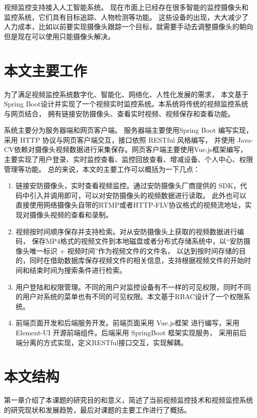 视频监控支持接入人工智能系统。
现在市面上已经存在很多智能的监控摄像头和监控系统，它们具有目标追踪、人物检测等功能。
这些设备的出现，大大减少了人力成本，比如以前要实现摄像头跟踪一个目标，就需要手动去调整摄像头的朝向
但是现在可以使用只能摄像头解决。

\section{本文主要工作}
为了满足视频监控系统数字化、智能化、网络化、人性化发展的需求，
本文基于Spring Boot设计并实现了一个视频实时监控系统。本系统将传统的视频监控系统与网页结合，
拥有链接安防摄像头、查看实时视频、视频保存和查看功能。

系统主要分为服务器端和网页客户端。
服务器端主要使用Spring Boot 编写实现，采用 HTTP 协议与网页客户端交互，接口依照 RESTful 风格编写，
并使用 Java-CV依赖对摄像头视频数据进行采集保存。网页客户端主要使用Vue.js框架编写，主要实现了用户登录、实时监控查看、监控回放查看、增减设备、个人中心、权限管理等功能。
总的来说，本文的主要工作可以概括为一下几点：
\begin{enumerate}
    \item 链接安防摄像头，实时查看视频监控。通过安防摄像头厂商提供的 SDK，代码中引入并调用即可，可以对安防摄像头的视频数据进行读取。
    此外也可以直接使用网络摄像头自带的RTMP或者HTTP-FLV协议格式的视频流地址，实现对摄像头视频的查看和录制。
    \item 视频按时间顺序保存并支持检索。对从安防摄像头上获取的视频数据进行编码，
    保存MP4格式的视频文件到本地磁盘或者分布式存储系统中，以“安防摄像头唯一标识 + 视频时间”作为视频文件的文件名，
    以达到按时间存储的目的，同时在借助数据库保存视频文件的相关信息，支持根据视频文件的开始时间和结束时间为搜索条件进行检索。
    \item 用户登陆和权限管理。不同的用户对监控设备有不一样的可见权限，同时不同的用户对系统的菜单也有不同的可见权限。本文基于RBAC设计了一个权限系统。
    \item 前端页面开发和后端服务开发。前端页面采用 Vue.js框架 进行编写，采用 Element-UI 开源前端组件。后端采用  SpringBoot 框架实现服务，
    采用前后端分离的方式实现，定义RESTful接口交互，实现解耦。
\end{enumerate}


\section{本文结构}
第一章介绍了本课题的研究目的和意义，简述了当前视频监控技术和视频监控系统的研究现状和发展趋势，最后对课题的主要工作进行了概括。

